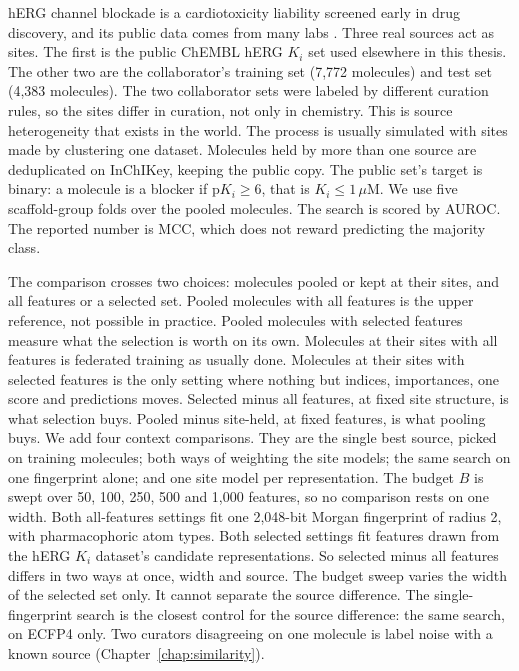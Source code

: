 hERG channel blockade is a cardiotoxicity liability screened early in drug discovery, and its public data comes from many labs \citep{Czodrowski2013}. Three real sources act as sites. The first is the public ChEMBL hERG $K_i$ set used elsewhere in this thesis. The other two are the collaborator's training set (7,772 molecules) and test set (4,383 molecules). The two collaborator sets were labeled by different curation rules, so the sites differ in curation, not only in chemistry. This is source heterogeneity that exists in the world. The process is usually simulated with sites made by clustering one dataset. Molecules held by more than one source are deduplicated on InChIKey, keeping the public copy. The public set's target is binary: a molecule is a blocker if $\mathrm{p}K_i \ge 6$, that is $K_i \le 1\,\mu\mathrm{M}$. We use five scaffold-group folds over the pooled molecules. The search is scored by AUROC. The reported number is MCC, which does not reward predicting the majority class.

The comparison crosses two choices: molecules pooled or kept at their sites, and all features or a selected set. Pooled molecules with all features is the upper reference, not possible in practice. Pooled molecules with selected features measure what the selection is worth on its own. Molecules at their sites with all features is federated training as usually done. Molecules at their sites with selected features is the only setting where nothing but indices, importances, one score and predictions moves. Selected minus all features, at fixed site structure, is what selection buys. Pooled minus site-held, at fixed features, is what pooling buys. We add four context comparisons. They are the single best source, picked on training molecules; both ways of weighting the site models; the same search on one fingerprint alone; and one site model per representation. The budget $B$ is swept over 50, 100, 250, 500 and 1,000 features, so no comparison rests on one width. Both all-features settings fit one 2,048-bit Morgan fingerprint of radius 2, with pharmacophoric atom types. Both selected settings fit features drawn from the hERG $K_i$ dataset's candidate representations. So selected minus all features differs in two ways at once, width and source. The budget sweep varies the width of the selected set only. It cannot separate the source difference. The single-fingerprint search is the closest control for the source difference: the same search, on ECFP4 only. Two curators disagreeing on one molecule is label noise with a known source (Chapter~\ref{chap:similarity}).

